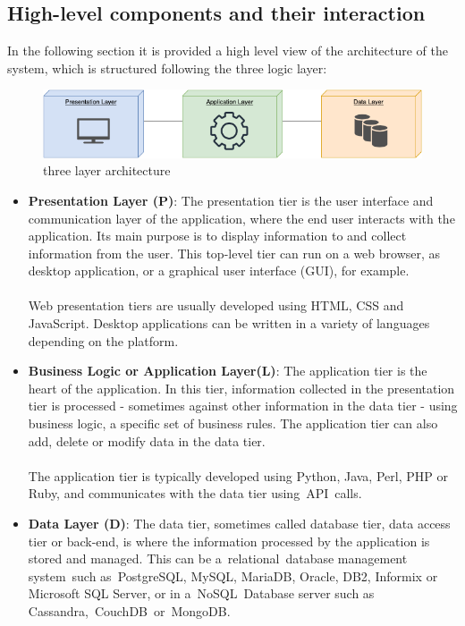 \subsection{High-level components and their interaction}
In the following section it is provided a high level view of the architecture of the system, which is structured following the three logic layer:\\

\begin{figure}[H]
    \begin{center}
    \includegraphics[width=1.2\textwidth]{images/System architecture.png}
    \caption{three layer architecture}
    \label{fig:system architecture}
    \end{center}
\end{figure}

\begin{itemize}
    \item \textbf{Presentation Layer (P)}: The presentation tier is the user interface and communication layer 
    of the application, where the end user interacts with the application. Its main purpose is to display 
    information to and collect information from the user. This top-level tier can run on a web browser, 
    as desktop application, or a graphical user interface (GUI), for example. \\ \\Web presentation tiers 
    are usually developed using HTML, CSS and JavaScript. Desktop applications can be written in a variety 
    of languages depending on the platform.
    \item \textbf{Business Logic or Application Layer(L)}: The application tier is the heart of the application. In this tier, information collected in the presentation tier is processed - sometimes against other information in the data tier - using business logic, a specific set of business rules. The application tier can also add, delete or modify data in the data tier.\\ \\The application tier is typically developed using Python, Java, Perl, PHP or Ruby, and communicates with the data tier using API calls. 
    \item \textbf{Data Layer (D)}: The data tier, sometimes called database tier, data access tier or back-end, is where the information processed by the application is stored and managed. This can be a relational database management system such as PostgreSQL, MySQL, MariaDB, Oracle, DB2, Informix or Microsoft SQL Server, or in a NoSQL Database server such as Cassandra, CouchDB or MongoDB. 
\end{itemize}

